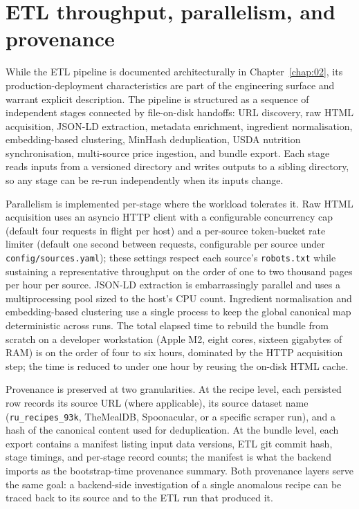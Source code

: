\section{ETL throughput, parallelism, and provenance}

While the ETL pipeline is documented architecturally in Chapter~\ref{chap:02}, its production-deployment characteristics are part of the engineering surface and warrant explicit description. The pipeline is structured as a sequence of independent stages connected by file-on-disk handoffs: URL discovery, raw HTML acquisition, JSON-LD extraction, metadata enrichment, ingredient normalisation, embedding-based clustering, MinHash deduplication, USDA nutrition synchronisation, multi-source price ingestion, and bundle export. Each stage reads inputs from a versioned directory and writes outputs to a sibling directory, so any stage can be re-run independently when its inputs change.

Parallelism is implemented per-stage where the workload tolerates it. Raw HTML acquisition uses an asyncio HTTP client with a configurable concurrency cap (default four requests in flight per host) and a per-source token-bucket rate limiter (default one second between requests, configurable per source under \texttt{config/sources.yaml}); these settings respect each source's \texttt{robots.txt} while sustaining a representative throughput on the order of one to two thousand pages per hour per source. JSON-LD extraction is embarrassingly parallel and uses a multiprocessing pool sized to the host's CPU count. Ingredient normalisation and embedding-based clustering use a single process to keep the global canonical map deterministic across runs. The total elapsed time to rebuild the bundle from scratch on a developer workstation (Apple M2, eight cores, sixteen gigabytes of RAM) is on the order of four to six hours, dominated by the HTTP acquisition step; the time is reduced to under one hour by reusing the on-disk HTML cache.

Provenance is preserved at two granularities. At the recipe level, each persisted row records its source URL (where applicable), its source dataset name (\texttt{ru\_recipes\_93k}, TheMealDB, Spoonacular, or a specific scraper run), and a hash of the canonical content used for deduplication. At the bundle level, each export contains a manifest listing input data versions, ETL git commit hash, stage timings, and per-stage record counts; the manifest is what the backend imports as the bootstrap-time provenance summary. Both provenance layers serve the same goal: a backend-side investigation of a single anomalous recipe can be traced back to its source and to the ETL run that produced it.

